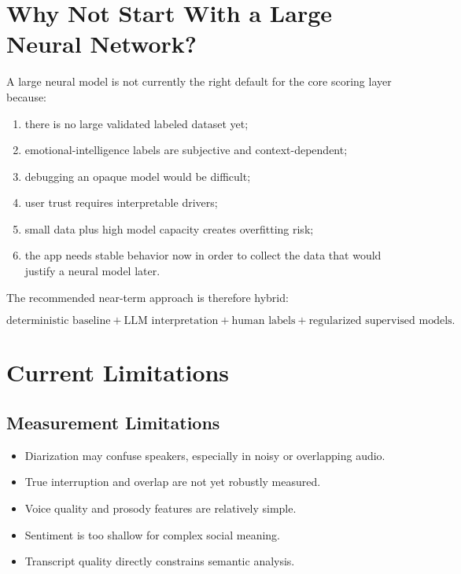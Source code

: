 \documentclass[11pt]{article}
\begin{document}
\section{Why Not Start With a Large Neural Network?}

A large neural model is not currently the right default for the core scoring layer because:

\begin{enumerate}[leftmargin=*]
  \item there is no large validated labeled dataset yet;
  \item emotional-intelligence labels are subjective and context-dependent;
  \item debugging an opaque model would be difficult;
  \item user trust requires interpretable drivers;
  \item small data plus high model capacity creates overfitting risk;
  \item the app needs stable behavior now in order to collect the data that would justify a neural model later.
\end{enumerate}

The recommended near-term approach is therefore hybrid:

\[
\text{deterministic baseline} + \text{LLM interpretation} + \text{human labels} + \text{regularized supervised models}.
\]

\section{Current Limitations}

\subsection{Measurement Limitations}

\begin{itemize}[leftmargin=*]
  \item Diarization may confuse speakers, especially in noisy or overlapping audio.
  \item True interruption and overlap are not yet robustly measured.
  \item Voice quality and prosody features are relatively simple.
  \item Sentiment is too shallow for complex social meaning.
  \item Transcript quality directly constrains semantic analysis.
\end{itemize}
\end{document}
